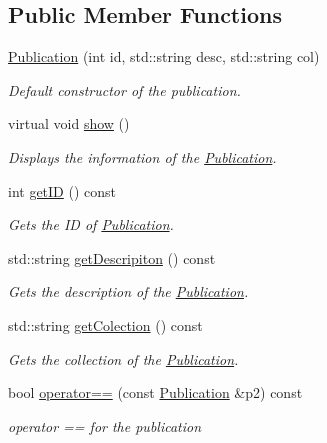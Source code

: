 \subsection*{Public Member Functions}
\begin{DoxyCompactItemize}
\item 
\hyperlink{class_publication_ab271fddf4b63d13af271f47979e9c4a7}{Publication} (int id, std\+::string desc, std\+::string col)
\begin{DoxyCompactList}\small\item\em Default constructor of the publication. \end{DoxyCompactList}\item 
virtual void \hyperlink{class_publication_aa4240a04fcecd6257e0d1a33e8f18ff0}{show} ()
\begin{DoxyCompactList}\small\item\em Displays the information of the \hyperlink{class_publication}{Publication}. \end{DoxyCompactList}\item 
int \hyperlink{class_publication_ab1b5251a7e94efcb7792edbac4ff93bc}{get\+ID} () const
\begin{DoxyCompactList}\small\item\em Gets the ID of \hyperlink{class_publication}{Publication}. \end{DoxyCompactList}\item 
std\+::string \hyperlink{class_publication_a5cc83441c3e2dd8daaa050a18b2e6bdd}{get\+Descripiton} () const
\begin{DoxyCompactList}\small\item\em Gets the description of the \hyperlink{class_publication}{Publication}. \end{DoxyCompactList}\item 
std\+::string \hyperlink{class_publication_ae1005ffcb387e2c1cd79483fdbb545c8}{get\+Colection} () const
\begin{DoxyCompactList}\small\item\em Gets the collection of the \hyperlink{class_publication}{Publication}. \end{DoxyCompactList}\item 
bool \hyperlink{class_publication_a60f079ac47aa4b8aa94957e15f12a2da}{operator==} (const \hyperlink{class_publication}{Publication} \&p2) const
\begin{DoxyCompactList}\small\item\em operator == for the publication \end{DoxyCompactList}\item 

\end{DoxyCompactItemize}

